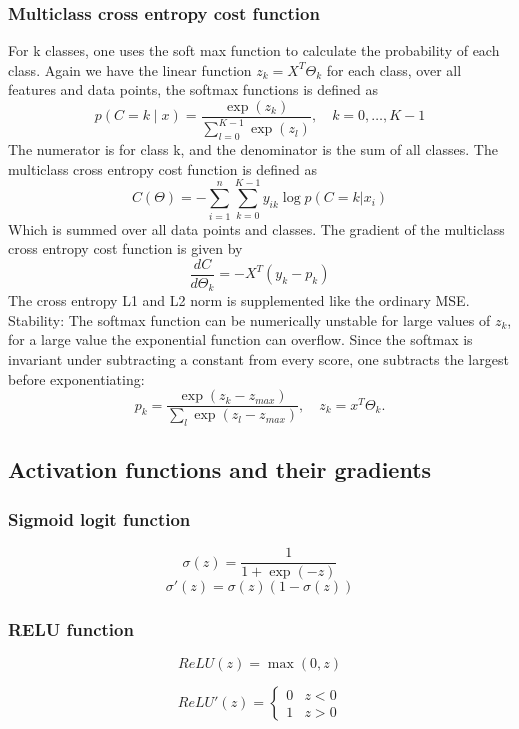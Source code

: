\subsubsection{Multiclass cross entropy cost function}
For k classes, one uses the soft max function to calculate the probability of each class.
Again we have the linear function $z_k = X^T\Theta_k$ for each class, over all features and data points, 
the softmax functions is defined as
\begin{equation}
    p(C = k \mid x) = \frac{\exp(z_k)}
                 {\sum_{l=0}^{K-1}\exp(z_l)}, \quad
        k = 0, \ldots, K-1
    \label{eq:SoftmaxFunc}
\end{equation}
The numerator is for class k, and the denominator is the sum of all classes.
The multiclass cross entropy cost function is defined as
\begin{equation}
    C(\Theta) = -\sum_{i=1}^{n}\sum_{k=0}^{K-1}y_{ik}\log p(C=k|x_i)
    \label{eq:SoftmaxCost}
\end{equation}
Which is summed over all data points and classes.
The gradient of the multiclass cross entropy cost function is given by
\begin{equation}
    \frac{dC}{d\Theta_k} = -X^T(y_k - p_k)
    \label{eq:SoftmaxCostGradient}
\end{equation}
The cross entropy L1 and L2 norm is supplemented like the ordinary MSE.  
Stability:
The softmax function can be numerically unstable for large values of $z_k$, for a large value the
exponential function can overflow. Since the softmax is invariant under subtracting a constant from
every score, one subtracts the largest before exponentiating:
\[p_k = \frac{\exp(z_k - z_{max})}{\sum_{l}\exp(z_l - z_{max})}, \quad z_k = x^T\Theta_k.\]
\cite[p.~151-156]{LectureNotes}

\subsection{Activation functions and their gradients}
\subsubsection{Sigmoid logit function}

\begin{equation}
    \sigma(z) = \frac{1}{1 + \exp(-z)}
    \label{eq:Sigmoid}
\end{equation}
\begin{equation}
    \sigma'(z) = \sigma(z)(1 - \sigma(z))
    \label{eq:SigmaPrime}
\end{equation}

\subsubsection{RELU function}

\begin{equation}
    ReLU(z) = \max(0, z)
    \label{eq:ReLU}
\end{equation}

\begin{equation}
    ReLU'(z) = \begin{cases}
        0 & z < 0 \\
        1 & z > 0
    \end{cases}
    \label{eq:ReLUPrime}
\end{equation}
\cite[p.~214-242]{LectureNotes}


